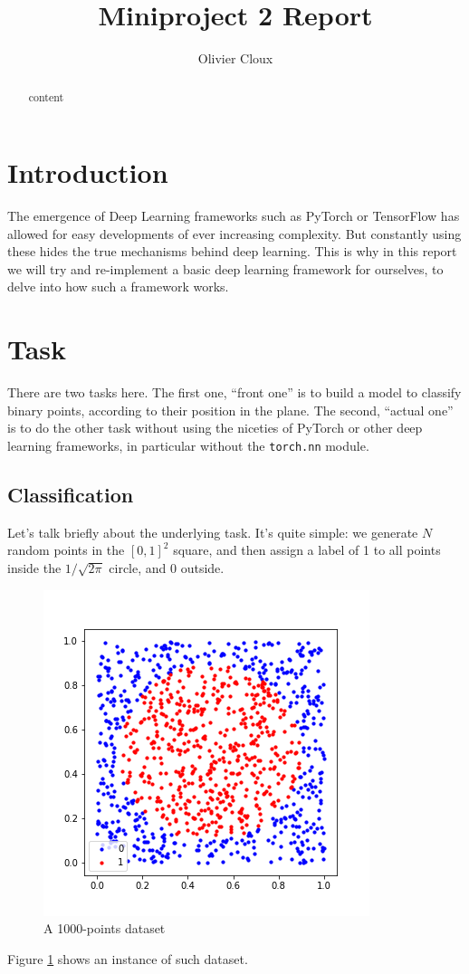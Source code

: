 \documentclass[10pt,conference]{IEEEtran}
\begin{document}
\title{Miniproject 2 Report}
\author[1]{Olivier Cloux}

\maketitle

\begin{abstract}
content
\end{abstract}

\section{Introduction}
The emergence of Deep Learning frameworks such as PyTorch \cite{noauthor_pytorch_nodate} or TensorFlow \cite{noauthor_tensorflow_nodate} has allowed for easy developments of ever increasing complexity. But constantly using these hides the true mechanisms behind deep learning. This is why in this report we will try and re-implement a basic deep learning framework for ourselves, to delve into how such a framework works.
\section{Task}
There are two tasks here. The first one, ``front one'' is to build a model to classify binary points, according to their position in the plane. The second, ``actual one'' is to do the other task without using the niceties of PyTorch or other deep learning frameworks, in particular without the \texttt{torch.nn} module.

\subsection{Classification}
Let's talk briefly about the underlying task. It's quite simple: we generate $N$ random points in the $[0,1]^2$ square, and then assign a label of 1 to all points inside the $1/\sqrt{2\pi}$ circle, and 0 outside.
\begin{figure}[h]
    \centering
    \includegraphics[scale=0.5]{../images/dataset.png}
    \caption{A 1000-points dataset}
    \label{fig:dataset}
\end{figure}
Figure \ref{fig:dataset} shows an instance of such dataset.
\end{document}
